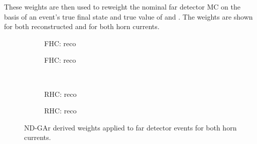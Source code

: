 These weights are then used to reweight the nominal far detector MC on the basis of an event's true final state and true value of \evis and \pvis.
The weights are shown for both reconstructed \numu and \nue for both horn currents.

\begin{figure}[h]
	\begin{subfigure}[t]{.5\linewidth}
		\begin{adjustbox}{max totalsize=\linewidth, center}
			
		\end{adjustbox}
		\caption{FHC: reco \numu}
	\end{subfigure}
	\hfill
	\begin{subfigure}[t]{.5\linewidth}
		\begin{adjustbox}{max totalsize=\linewidth, center}
			
		\end{adjustbox}
		\caption{FHC: reco \nue}
	\end{subfigure}	\\
	\begin{subfigure}[t]{.5\linewidth}
		\begin{adjustbox}{max totalsize=\linewidth, center}
			
		\end{adjustbox}
		\caption{RHC: reco \numu}
	\end{subfigure}
	\hfill
	\begin{subfigure}[t]{.5\linewidth}
		\begin{adjustbox}{max totalsize=\linewidth, center}
			
		\end{adjustbox}
		\caption{RHC: reco \nue}
	\end{subfigure}
	\caption[ND-GAr derived weights applied to far detector events]{ND-GAr derived weights applied to far detector events for both horn currents.}
\end{figure}